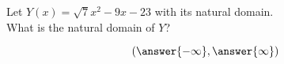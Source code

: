 \documentclass{ximera}
\begin{document}
\begin{exercise}
\begin{question}
\end{question}













\begin{question}


Let $Y(x) = \sqrt{7} x^2 - 9x - 23$ with its natural domain. \\

What is the natural domain of $Y$?

\[
\left( \answer{-\infty}, \answer{\infty}  \right)
\]


\end{question}













\end{exercise}
\end{document}
